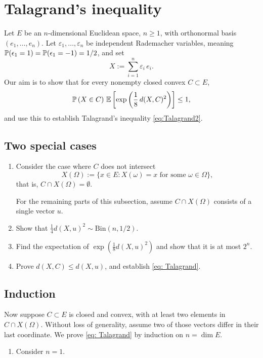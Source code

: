 \documentclass[a4paper]{report}
\begin{document}
\bigskip

\section{Talagrand's inequality}
\label{sec:2}
Let \(E\) be an \(n\)-dimensional Euclidean space, \(n\geq1\), with orthonormal basis \((e_1,\ldots,e_n)\). Let \(\varepsilon_1,\ldots,\varepsilon_n\) be independent Rademacher variables, meaning
$\P(\epsilon_1=1)=\P(\epsilon_1=-1)=1/2$, and set
\[
X:=\sum_{i=1}^n \varepsilon_i\,e_i.
\]
Our aim is to show that for every nonempty closed convex \(C\subset E\),
\begin{equation}
    \label{eq: Talagrand}
\mathbb{P}\lbrb{X\in C}\,
\Ebb{\exp\lbrb{\frac18\,d(X,C)^2}}\le1,
\end{equation}
and use this to establish Talagrand's inequality \eqref{eq:Talagrand2}.

\subsection{Two special cases}
\begin{enumerate}
\item Consider the case where \(C\) does not intersect \[X(\Omega):=\{x\in E:X(\omega)=x
\text{ for some }\omega\in\Omega\},\] that is, $C\cap X(\Omega)=\emptyset$.
  
For the remaining parts of this subsection, assume \(C\cap X(\Omega)\) consists of a single vector \(u\).
\item Show that \(\frac14d(X,u)^2\sim\mathrm{Bin}(n,1/2)\).
\item Find the expectation of \(\exp(\frac18d(X,u)^2)\) and show that it is at most \(2^n\).
\item Prove \(d(X,C)\leq d(X,u)\), and establish
  \eqref{eq: Talagrand}.
\end{enumerate}

\subsection{Induction}
Now suppose \(C\subset E\) is closed and convex, with at least two elements in \(C\cap X(\Omega)\).
Without loss of generality, assume two of those vectors differ in their last coordinate.
We prove \eqref{eq: Talagrand} by induction on \(n=\dim E\).
\begin{enumerate}
\item Consider \(n=1\).
\end{enumerate}
\end{document}
